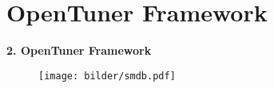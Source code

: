 %     
    
  \section{OpenTuner Framework}
  
  



  
  \begingroup
  \begin{frame}
  
  \textbf{2. OpenTuner Framework}
    
  
  \begin{figure}[ht]
    \centering	      
    \texttt{[image: bilder/smdb.pdf]}
    \label{smdb}
  \end{figure}

  \end{frame}
  \endgroup
    
